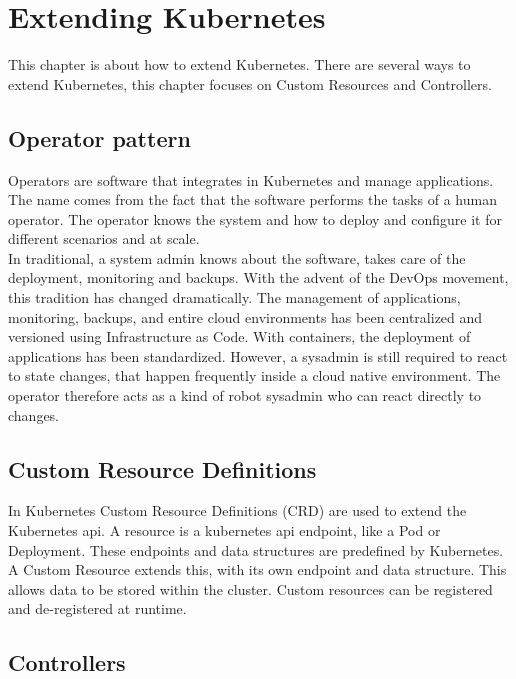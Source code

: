 \chapter{Extending Kubernetes}

This chapter is about how to extend Kubernetes.
There are several ways to extend Kubernetes, this chapter focuses on Custom Resources and Controllers.

\section{Operator pattern}

Operators are software that integrates in Kubernetes and manage applications.
The name comes from the fact that the software performs the tasks of a human operator.
The operator knows the system and how to deploy and configure it for different scenarios and at scale.~\cite{KUBERNETES-OPERATOR}
\\
In traditional, a system admin knows about the software, takes care of the deployment, monitoring and backups.
With the advent of the DevOps movement, this tradition has changed dramatically.
The management of applications, monitoring, backups, and entire cloud environments has been centralized and versioned using Infrastructure as Code.
With containers, the deployment of applications has been standardized.
However, a sysadmin is still required to react to state changes, that happen frequently inside a cloud native environment.
The operator therefore acts as a kind of robot sysadmin who can react directly to changes.~\cite{RED-HAT-OPERATOR}

\section{Custom Resource Definitions}

In Kubernetes Custom Resource Definitions (CRD) are used to extend the Kubernetes api.
A resource is a kubernetes api endpoint, like a Pod or Deployment.
These endpoints and data structures are predefined by Kubernetes.
A Custom Resource extends this, with its own endpoint and data structure.
This allows data to be stored within the cluster.
Custom resources can be registered and de-registered at runtime.~\cite{KUBERNETES-CRD}


\section{Controllers}

